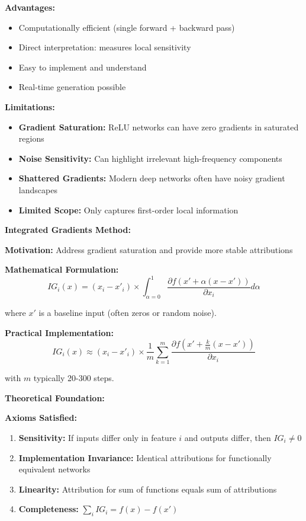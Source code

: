 \documentclass[12pt]{article}
\begin{document}
\begin{enumerate}[(a)]
{    \textbf{Advantages:}
    \begin{itemize}
        \item Computationally efficient (single forward + backward pass)
        \item Direct interpretation: measures local sensitivity
        \item Easy to implement and understand
        \item Real-time generation possible
    \end{itemize}
    
    \textbf{Limitations:}
    \begin{itemize}
        \item \textbf{Gradient Saturation:} ReLU networks can have zero gradients in saturated regions
        \item \textbf{Noise Sensitivity:} Can highlight irrelevant high-frequency components
        \item \textbf{Shattered Gradients:} Modern deep networks often have noisy gradient landscapes
        \item \textbf{Limited Scope:} Only captures first-order local information
    \end{itemize}
    
    \textbf{Integrated Gradients Method:}
    
    \textbf{Motivation:} Address gradient saturation and provide more stable attributions
    
    \textbf{Mathematical Formulation:}
    $$IG_i(x) = (x_i - x'_i) \times \int_{\alpha=0}^1 \frac{\partial f(x' + \alpha(x - x'))}{\partial x_i} d\alpha$$
    
    where $x'$ is a baseline input (often zeros or random noise).
    
    \textbf{Practical Implementation:}
    $$IG_i(x) \approx (x_i - x'_i) \times \frac{1}{m} \sum_{k=1}^m \frac{\partial f(x' + \frac{k}{m}(x - x'))}{\partial x_i}$$
    
    with $m$ typically 20-300 steps.
    
    \textbf{Theoretical Foundation:}
    
    \textbf{Axioms Satisfied:}
    \begin{enumerate}
        \item \textbf{Sensitivity:} If inputs differ only in feature $i$ and outputs differ, then $IG_i \neq 0$
        \item \textbf{Implementation Invariance:} Identical attributions for functionally equivalent networks
        \item \textbf{Linearity:} Attribution for sum of functions equals sum of attributions
        \item \textbf{Completeness:} $\sum_i IG_i = f(x) - f(x')$
    \end{enumerate}
    
}
\end{enumerate}
\end{document}
